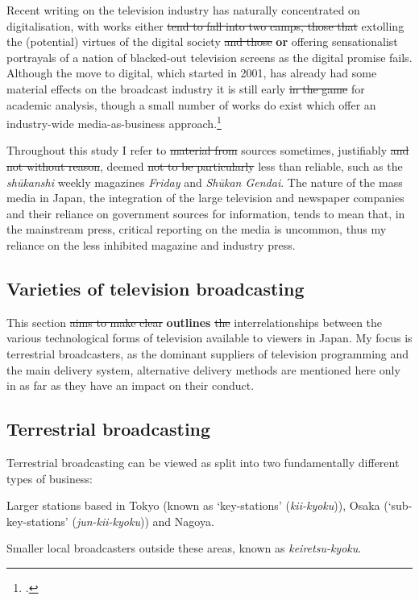 \documentclass[11pt, oneside, a4paper, headsepline]{scrartcl}
\newenvironment{close_item}{
\begin{itemize}
 \setlength{\itemsep}{1pt}
 \setlength{\parskip}{1pt}
 \setlength{\parsep}{0pt}}{\end{itemize}
}
\begin{document}
Recent writing on the television industry has naturally concentrated on digitalisation, with works either \st{tend to fall into two camps, those that} extolling the (potential) virtues of the digital society \st{and those} \textbf{or} offering sensationalist portrayals of a nation of blacked-out television screens as the digital promise fails. Although the move to digital, which started in 2001, has already had some material effects on the broadcast industry it is still early \st{in the game} for academic analysis, though a small number of works do exist which offer an industry-wide media-as-business approach.\footcites{Yuasa:2006, Matsuoka:2004}

Throughout this study I refer to \st{material from} sources sometimes, justifiably \st{and not without reason}, deemed \st{not to be particularly} less than reliable, such as the \textit{sh\={u}kanshi} weekly magazines \textit{Friday} and \textit{Sh\={u}kan Gendai}. The nature of the mass media in Japan, the integration of the large television and newspaper companies and their reliance on government sources for information, tends to mean that, in the mainstream press, critical reporting on the media is uncommon, thus my reliance on the less inhibited magazine and industry press.

\subsection{Varieties of television broadcasting}
 
This section \st{aims to make clear} \textbf{outlines} \st{the} interrelationships between the various technological forms of television available to viewers in Japan. My focus is terrestrial broadcasters, as the dominant suppliers of television programming and the main delivery system, alternative delivery methods are mentioned here only in as far as they have an impact on their conduct.

\subsection{Terrestrial broadcasting}
\label{subsec:terr-tv}Terrestrial broadcasting can be viewed as split into two fundamentally different types of business:

\begin{close_item}
\item Larger stations based in Tokyo (known as `key-stations' (\textit{kii-kyoku})), Osaka (`sub-key-stations' (\textit{jun-kii-kyoku})) and Nagoya.
\item Smaller local broadcasters outside these areas, known as \emph{keiretsu-kyoku}. 
\end{close_item}
\end{document}

